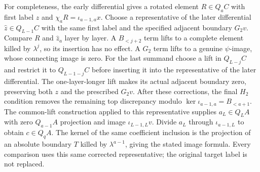 For completeness, the early differential gives a rotated element
$R\in Q_aC$ with first label $z$ and
$\chi_aR=\iota_{a-1,a}x$. Choose a representative of the later differential
$\widehat z\in Q_{L-1}C$ with the same first label and the specified
adjacent boundary $G_2v$. Compare $R$ and $\widehat z_a$ layer by layer.
A $B_{<j+2}$ term lifts to a complete element killed by $\lambda^j$,
so its insertion has no effect. A $G_2$ term lifts to a genuine
$\psi$-image, whose connecting image is zero. For the last summand choose
a lift in $Q_{L-j}C$ and restrict it to $Q_{L-1-j}C$ before inserting it
into the representative of the later differential. The one-layer-longer lift makes its actual
adjacent boundary zero, preserving both $z$ and the prescribed $G_2v$.
After these corrections, the final $H_2$ condition removes the remaining
top discrepancy modulo $\ker\iota_{a-1,a}=B_{<a+1}$.
The common-lift construction applied to this representative supplies $a_L\in Q_LA$ with zero
$Q_{a-1}A$ projection and image $\iota_{L-1,L}v$.
Divide $a_L$ through $\iota_{a-1,L}$ to obtain $c\in Q_qA$.
The kernel of the same coefficient inclusion is the projection of an
absolute boundary $T$ killed by $\lambda^{a-1}$, giving the stated image
formula. Every comparison uses this same corrected representative;
the original target label is not replaced.

